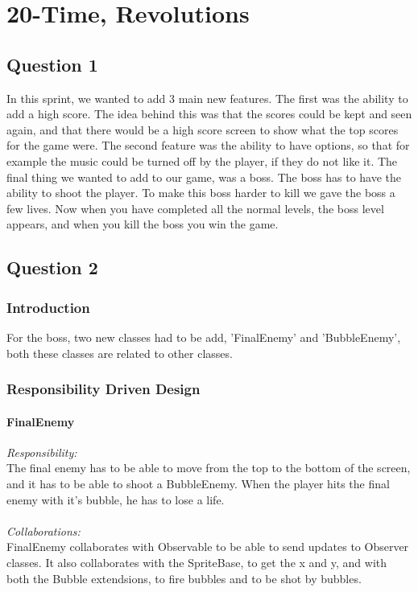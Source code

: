\chapter{20-Time, Revolutions}

\section{Question 1}

In this sprint, we wanted to add 3 main new features. The first was the ability to add a high score. The idea behind this was that the scores could be kept and seen again, and that there would be a high score screen to show what the top scores for the game were. The second feature was the ability to have options, so that for example the music could be turned off by the player, if they do not like it. The final thing we wanted to add to our game, was a boss. The boss has to have the ability to shoot the player. To make this boss harder to kill we gave the boss a few lives. Now when you have completed all the normal levels, the boss level appears, and when you kill the boss you win the game.

\section{Question 2}

\subsection{Introduction}

For the boss, two new classes had to be add, 'FinalEnemy' and 'BubbleEnemy', both these classes are related to other classes.

\subsection{Responsibility Driven Design} 

\subsubsection{FinalEnemy}
\textit{Responsibility:} \\
The final enemy has to be able to move from the top to the bottom of the screen, and it has to be able to shoot a BubbleEnemy. When the player hits the final enemy with it's bubble, he has to lose a life. \\ \\
\textit{Collaborations:} \\
FinalEnemy collaborates with Observable to be able to send updates to Observer classes. It also collaborates with  the SpriteBase, to get the x and y, and with both the Bubble extendsions, to fire bubbles and to be shot by bubbles.

